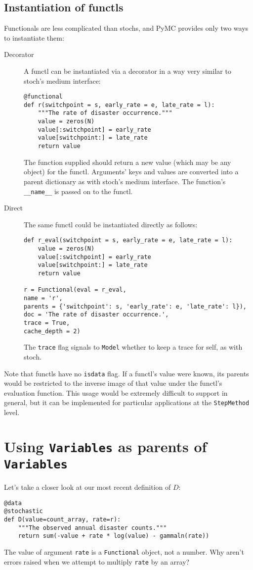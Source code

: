 \subsection{Instantiation of functls}
Functionals are less complicated than stochs, and PyMC provides only two ways to instantiate them:
\begin{description}
    \item[Decorator] A functl can be instantiated via a decorator in a way very similar to stoch's medium interface:
\begin{verbatim}
@functional
def r(switchpoint = s, early_rate = e, late_rate = l):
    """The rate of disaster occurrence."""
    value = zeros(N)
    value[:switchpoint] = early_rate
    value[switchpoint:] = late_rate
    return value
\end{verbatim}
The function supplied should return a new value (which may be any object) for the functl. Arguments' keys and values are converted into a parent dictionary as with stoch's medium interface. The function's \texttt{\_\_name\_\_} is passed on to the functl.
    \item[Direct] The same functl could be instantiated directly as follows:
\begin{verbatim}
def r_eval(switchpoint = s, early_rate = e, late_rate = l):
    value = zeros(N)
    value[:switchpoint] = early_rate
    value[switchpoint:] = late_rate
    return value

r = Functional(eval = r_eval, 
name = 'r',
parents = {'switchpoint': s, 'early_rate': e, 'late_rate': l}),
doc = 'The rate of disaster occurrence.',
trace = True,
cache_depth = 2)
\end{verbatim}
The \texttt{trace} flag signals to \texttt{Model} whether to keep a trace for self, as with stoch.
\end{description}

Note that functls have no \texttt{isdata} flag. If a functl's value were known, its parents would be restricted to the inverse image of that value under the functl's evaluation function. This usage would be extremely difficult to support in general, but it can be implemented for particular applications at the \texttt{StepMethod} level.

\section{Using \texttt{Variables} as parents of \texttt{Variables}}

Let's take a closer look at our most recent definition of $D$:
\begin{verbatim}
@data
@stochastic
def D(value=count_array, rate=r):
    """The observed annual disaster counts."""
    return sum(-value + rate * log(value) - gammaln(rate))
\end{verbatim}
The value of argument \texttt{rate} is a \texttt{Functional} object, not a number. Why aren't errors raised when we attempt to multiply \texttt{rate} by an array?

